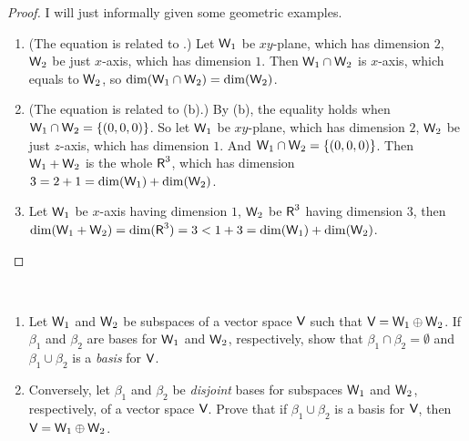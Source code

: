 \begin{proof}
I will just informally given some geometric examples.
\begin{enumerate}
\item (The equation is related to .) Let \(\textsf{W}_1\) be \(xy\)-plane, which has dimension \(2\), \(\textsf{W}_2\) be just \(x\)-axis, which has dimension \(1\).
    Then \(\textsf{W}_1 \cap \textsf{W}_2\) is \(x\)-axis, which equals to \(\textsf{W}_2\), so \(\dim(\textsf{W}_1 \cap \textsf{W}_2) = \dim(\textsf{W}_2)\).
\item (The equation is related to (b).) By (b), the equality holds when \(\textsf{W}_1 \cap \textsf{W}_2 = \{ (0, 0, 0) \}\).
    So let \(\textsf{W}_1\) be \(xy\)-plane, which has dimension \(2\), \(\textsf{W}_2\) be just \(z\)-axis, which has dimension \(1\).
    And \(\textsf{W}_1 \cap \textsf{W}_2 = \{ (0, 0, 0) \}\).
    Then \(\textsf{W}_1 + \textsf{W}_2\) is the whole \(\textsf{R}^3\), which has dimension \(3 = 2 + 1 = \dim(\textsf{W}_1) + \dim(\textsf{W}_2)\).
\item Let \(\textsf{W}_1\) be \(x\)-axis having dimension \(1\), \(\textsf{W}_2\) be \(\textsf{R}^3\) having dimension \(3\), then \(\dim(\textsf{W}_1 + \textsf{W}_2) = \dim(\textsf{R}^3) = 3 < 1 + 3 = \dim(\textsf{W}_1) + \dim(\textsf{W}_2)\).
\end{enumerate}
\end{proof}

\begin{exercise} \label{exercise 1.6.33} \ 

\begin{enumerate}
\item Let \(\textsf{W}_1\) and \(\textsf{W}_2\) be subspaces of a vector space \(\textsf{V}\) such that \(\textsf{V} = \textsf{W}_1 \oplus \textsf{W}_2\).
    If \(\beta_1\) and \(\beta_2\) are bases for \(\textsf{W}_1\) and \(\textsf{W}_2\), respectively, show that \(\beta_1 \cap \beta_2 = \emptyset\) and \(\beta_1 \cup \beta_2\) is a \emph{basis} for \(\textsf{V}\).
\item Conversely, let \(\beta_1\) and \(\beta_2\) be \emph{disjoint} bases for subspaces \(\textsf{W}_1\) and \(\textsf{W}_2\), respectively, of a vector space \(\textsf{V}\).
    Prove that if \(\beta_1 \cup \beta_2\) is a basis for \(\textsf{V}\), then \(\textsf{V} = \textsf{W}_1 \oplus \textsf{W}_2\).
\end{enumerate}
\end{exercise}

